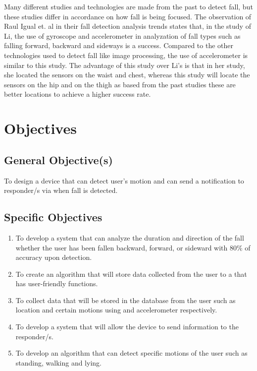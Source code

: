 Many different studies and technologies are made from the past to detect fall, but these studies differ in accordance on how fall is being focused. The observation of Raul Igual et. al in their fall detection analysis trends states that, in the study of Li, the use of gyroscope and accelerometer in analyzation of fall types such as falling forward, backward and sideways is a success. Compared to the other technologies used to detect fall like image processing, the use of accelerometer is similar to this study. The advantage of this study over Li’s is that in her study, she located the sensors on the waist and chest, whereas this study will locate the sensors on the hip and on the thigh as based from the past studies these are better locations to achieve a higher success rate. \cite{Igu13} %

\section{Objectives}
\label{sec:objectives}

\subsection{General Objective(s)}
To design a device that can detect user’s motion and can send a notification to responder/s via  when fall is detected.

\subsection{Specific Objectives}

\begin{enumerate}
	\item To develop a system that can analyze the duration and direction of the fall whether the user has been fallen backward, forward, or sideward with 80\% of accuracy upon detection.
	
	\item To create an algorithm that will store data collected from the user to a  that has user-friendly functions.
	
	\item To collect data that will be stored in the database from the user such as location and certain motions using  and accelerometer respectively.
	
	\item To develop a system that will allow the device to send information to the responder/s.
	
	\item To develop an algorithm that can detect specific motions of the user such as standing, walking and lying.
\end{enumerate}

